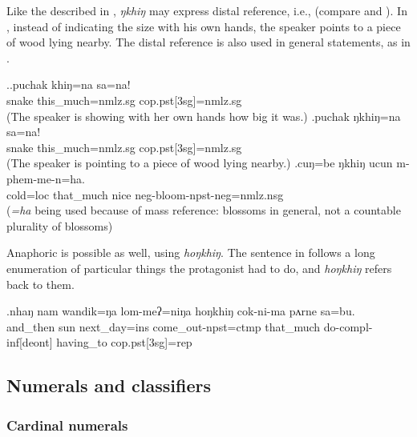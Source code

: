 Like the  described in , \emph{ŋkhiŋ} may express distal reference, i.e.,  (compare \Next[a] and \Next[b]). In \Next[b], instead of indicating the size with his own hands, the speaker points to a piece of wood lying nearby. The distal reference is also used in general statements, as in \Next[c].

\ex.\ag.puchak khiŋ=na sa=na!\\
snake this\_much{\sc =nmlz.sg} {\sc cop.pst[3sg]=nmlz.sg}\\
 (The speaker is showing with her own hands how big it was.)
\bg.puchak ŋkhiŋ=na sa=na!\\
snake this\_much{\sc =nmlz.sg} {\sc cop.pst[3sg]=nmlz.sg}\\
 (The speaker is pointing to a piece of wood lying nearby.)
\bg.cuŋ=be ŋkhiŋ ucun m-phem-me-n=ha.\\
cold{\sc =loc} that\_much nice {\sc neg-}bloom{\sc [3sg]-npst-neg=nmlz.nsg}\\
 (\emph{=ha} being used because of mass reference: blossoms in general, not a countable plurality of blossoms) 

 
Anaphoric  is possible as well, using \emph{hoŋkhiŋ}. The sentence in \Next follows a long enumeration of particular things the protagonist had to do, and \emph{hoŋkhiŋ} refers back to them.

\exg.nhaŋ    nam wandik=ŋa lom-meʔ=niŋa        hoŋkhiŋ cok-ni-ma           pʌrne    sa=bu.\\
and\_then sun next\_day{\sc =ins} come\_out{\sc [3sg]-npst=ctmp} that\_much do{\sc -compl-inf[deont]} having\_to {\sc cop.pst[3sg]=rep}\\
  

\subsection{Numerals and classifiers}\label{sec-num}

\subsubsection{Cardinal numerals}

